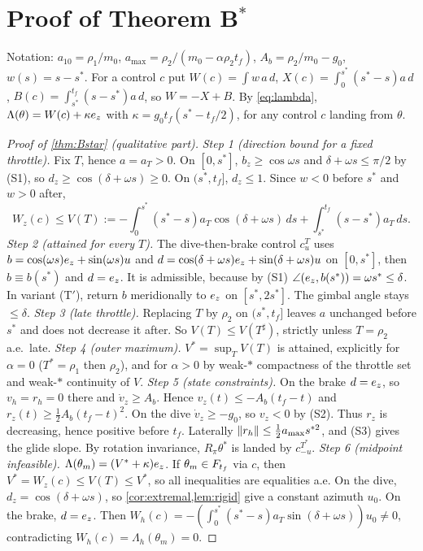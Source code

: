 \section{Proof of Theorem B$^*$}\label{app:Bstar}
Notation:
$a_{10}=\rho_1/m_0$, $a_{\max}=\rho_2/(m_0-\alpha\rho_2t_f)$, $A_b=\rho_2/m_0-g_0$, $w(s)=s-s^*$. For a control $c$ put
$W(c)=\int w\,a\,d$, $X(c)=\int_0^{s^*}(s^*-s)a\,d$, $B(c)=\int_{s^*}^{t_f}(s-s^*)a\,d$, so $W=-X+B$. By \eqref{eq:lambda},
$\Lambda(\theta)=W(c)+\kappa e_z$ with $\kappa=g_0t_f(s^*-t_f/2)$, for any control $c$ landing from $\theta$.

\begin{proof}[Proof of \cref{thm:Bstar} (qualitative part)]
\emph{Step 1 (direction bound for a fixed throttle).} Fix $T$, hence $a=a_T>0$. On $[0,s^*]$, $b_z\ge\cos\omega s$ and
$\delta+\omega s\le\pi/2$ by (S1), so $d_z\ge\cos(\delta+\omega s)\ge0$. On $(s^*,t_f]$, $d_z\le1$. Since $w<0$ before $s^*$ and $w>0$ after,
\[
W_z(c)\le V(T):=-\int_0^{s^*}(s^*-s)a_T\cos(\delta+\omega s)\,ds+\int_{s^*}^{t_f}(s-s^*)a_T\,ds .
\]
\emph{Step 2 (attained for every $T$).} The dive-then-brake control $c^T_u$ uses $b=\cos(\omega s)e_z+\sin(\omega s)u$ and
$d=\cos(\delta+\omega s)e_z+\sin(\delta+\omega s)u$ on $[0,s^*]$, then $b\equiv b(s^*)$ and $d=e_z$. It is admissible, because by (S1)
$\angle(e_z,b(s^*))=\omega s^*\le\delta$. In variant (T$'$), return $b$ meridionally to $e_z$ on $[s^*,2s^*]$. The gimbal angle stays $\le\delta$.
\emph{Step 3 (late throttle).} Replacing $T$ by $\rho_2$ on $(s^*,t_f]$ leaves $a$ unchanged before $s^*$ and does not decrease it after. So
$V(T)\le V(T^\sharp)$, strictly unless $T=\rho_2$ a.e.\ late.
\emph{Step 4 (outer maximum).} $V^*=\sup_TV(T)$ is attained, explicitly for $\alpha=0$ ($T^*=\rho_1$ then $\rho_2$), and for $\alpha>0$ by
weak-$*$ compactness of the throttle set and weak-$*$ continuity of $V$.
\emph{Step 5 (state constraints).} On the brake $d=e_z$, so $v_h=r_h=0$ there and $\dot v_z\ge A_b$. Hence $v_z(t)\le-A_b(t_f-t)$ and
$r_z(t)\ge\tfrac12A_b(t_f-t)^2$. On the dive $\dot v_z\ge-g_0$, so $v_z<0$ by (S2). Thus $r_z$ is decreasing, hence positive before
$t_f$. Laterally $\lVert r_h\rVert\le\tfrac12a_{\max}s^{*2}$, and (S3) gives the glide slope. By rotation invariance, $R_\pi\theta^*$ is landed by
$c^{T^*}_{-u}$.
\emph{Step 6 (midpoint infeasible).} $\Lambda(\theta_m)=(V^*+\kappa)e_z$. If $\theta_m\in F_{t_f}$ via $c$, then $V^*=W_z(c)\le V(T)\le V^*$, so all
inequalities are equalities a.e. On the dive, $d_z=\cos(\delta+\omega s)$, so \cref{cor:extremal,lem:rigid} give a constant azimuth $u_0$. On
the brake, $d=e_z$. Then $W_h(c)=-(\int_0^{s^*}(s^*-s)a_T\sin(\delta+\omega s))u_0\ne0$, contradicting $W_h(c)=\Lambda_h(\theta_m)=0$.
\end{proof}

